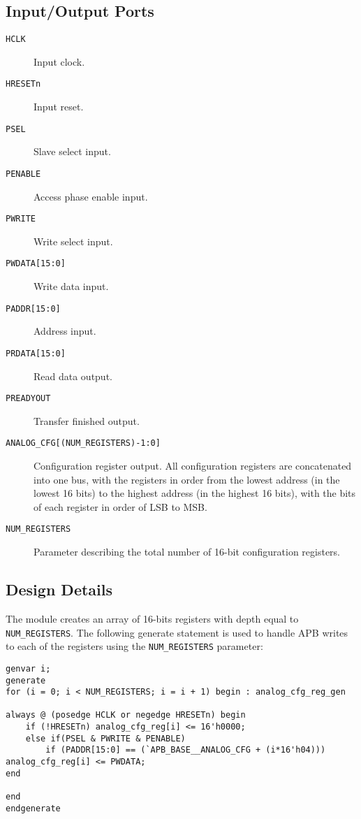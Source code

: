 \subsection{Input/Output Ports}
\begin{description}
	\item[\texttt{HCLK}] Input clock.
	\item[\texttt{HRESETn}] Input reset.
	\item[\texttt{PSEL}] Slave select input.
	\item[\texttt{PENABLE}] Access phase enable input.
	\item[\texttt{PWRITE}] Write select input.
	\item[\texttt{PWDATA[15:0]}] Write data input.
	\item[\texttt{PADDR[15:0]}] Address input.
	\item[\texttt{PRDATA[15:0]}] Read data output.
	\item[\texttt{PREADYOUT}] Transfer finished output.
	\item[\texttt{ANALOG\_CFG[(NUM\_REGISTERS)-1:0]}] Configuration register output. All configuration registers are concatenated into one bus, with the registers in order from the lowest address (in the lowest 16 bits) to the highest address (in the highest 16 bits), with the bits of each register in order of LSB to MSB.
	\item[\texttt{NUM\_REGISTERS}] Parameter describing the total number of 16-bit configuration registers. 
\end{description}

\subsection{Design Details}
The module creates an array of 16-bits registers with depth equal to \texttt{NUM\_REGISTERS}. The following generate statement is used to handle APB writes to each of the registers using the \texttt{NUM\_REGISTERS} parameter:

\begin{lstlisting}
genvar i;
generate
for (i = 0; i < NUM_REGISTERS; i = i + 1) begin : analog_cfg_reg_gen

always @ (posedge HCLK or negedge HRESETn) begin
    if (!HRESETn) analog_cfg_reg[i] <= 16'h0000;
    else if(PSEL & PWRITE & PENABLE)
        if (PADDR[15:0] == (`APB_BASE__ANALOG_CFG + (i*16'h04))) analog_cfg_reg[i] <= PWDATA;
end	

end
endgenerate
\end{lstlisting}

